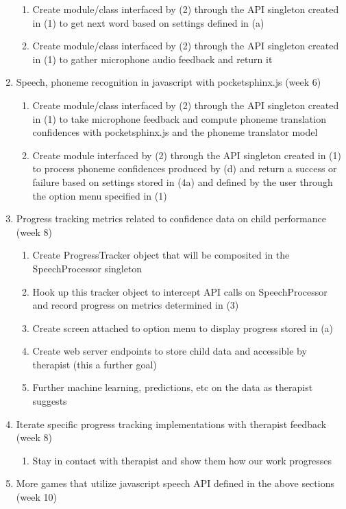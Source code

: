 \documentclass{article}
\begin{document}
\begin{enumerate}
\begin{enumerate}
        \item Create module/class interfaced by (2) through the API singleton created in (1) to get next word based on settings defined in (a)
        \item Create module/class interfaced by (2) through the API singleton created in (1) to gather microphone audio feedback and return it
    \end{enumerate}
    \item Speech, phoneme recognition in javascript with pocketsphinx.js (week 6)
    \begin{enumerate}
        \item Create module/class interfaced by (2) through the API singleton created in (1) to take microphone feedback and compute phoneme translation confidences with pocketsphinx.js and the phoneme translator model
        \item Create module interfaced by (2) through the API singleton created in (1) to process phoneme confidences produced by (d) and return a success or failure based on settings stored in (4a) and defined by the user through the option menu specified in (1)
    \end{enumerate}
    \item Progress tracking metrics related to confidence data on child performance (week 8)
    \begin{enumerate}
        \item Create ProgressTracker object that will be composited in the SpeechProcessor singleton
        \item Hook up this tracker object to intercept API calls on SpeechProcessor and record progress on metrics determined in (3)
        \item Create screen attached to option menu to display progress stored in (a)
        \item Create web server endpoints to store child data and accessible by therapist (this a further goal)
        \item Further machine learning, predictions, etc on the data as therapist suggests
    \end{enumerate}
    \item Iterate specific progress tracking implementations with therapist feedback (week 8)
    \begin{enumerate}
        \item Stay in contact with therapist and show them how our work progresses
    \end{enumerate}
    \item More games that utilize javascript speech API defined in the above sections (week 10)

\end{enumerate}
\end{document}
